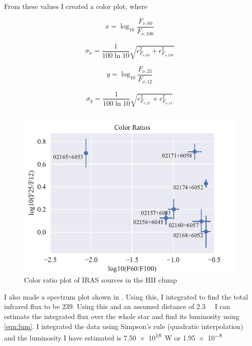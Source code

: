 \documentclass[]{article}
\begin{document}
From these values I created a color plot, where 

\begin{equation}
x = \log_{10}{\frac{F_{\nu, 60}}{F_{\nu, 100}}}
\end{equation}

\begin{equation}
\sigma_x = \frac{1}{100 \ln{10}}\sqrt{\epsilon_{F_{\nu,60}}^2 + \epsilon_{F_{\nu,100}}^2}
\end{equation}

\begin{equation}
y = \log_{10}{\frac{F_{\nu, 25}}{F_{\nu, 12}}}
\end{equation}

\begin{equation}
\sigma_y = \frac{1}{100 \ln{10}}\sqrt{\epsilon_{F_{\nu,25}}^2 + \epsilon_{F_{\nu,12}}^2}
\end{equation}

\begin{figure}[H]
	\centering
	\includegraphics[]{figs/colors.pdf}
	\caption{Color ratio plot of IRAS sources in the HII clump}
	\label{fig:colors}
\end{figure}

I also made a spectrum plot shown in . Using this, I integrated to find the total infrared flux to be \SI{239}{\jansky}. Using this and an assumed distance of \SI{2.3}{\kilo\pc} I can estimate the integrated flux over the whole star and find its luminosity using \autoref{eqn:lum}. I integrated the data using Simpson's rule (quadratic interpolation) and the luminosity I have estimated is \SI{7.50e18}{\watt} or \SI{1.95e-8}{\solarlum}
\end{document}
